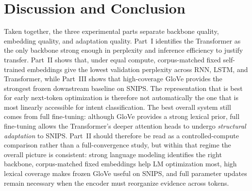 \documentclass[10pt,a4paper]{article}
\begin{document}
\section{Discussion and Conclusion}
\label{sec:conclusion}

Taken together, the three experimental parts separate backbone quality, embedding quality, and adaptation quality. Part~I identifies the Transformer as the only backbone strong enough in perplexity and inference efficiency to justify transfer. Part~II shows that, under equal compute, corpus-matched fixed self-trained embeddings give the lowest validation perplexity across RNN, LSTM, and Transformer, while Part~III shows that high-coverage GloVe provides the strongest frozen downstream baseline on SNIPS. The representation that is best for early next-token optimization is therefore not automatically the one that is most linearly accessible for intent classification. The best overall system still comes from full fine-tuning: although GloVe provides a strong lexical prior, full fine-tuning allows the Transformer's deeper attention heads to undergo \emph{structural adaptation} to SNIPS. Part~II should therefore be read as a controlled-compute comparison rather than a full-convergence study, but within that regime the overall picture is consistent: strong language modeling identifies the right backbone, corpus-matched fixed embeddings help LM optimization most, high lexical coverage makes frozen GloVe useful on SNIPS, and full parameter updates remain necessary when the encoder must reorganize evidence across tokens.
\end{document}
